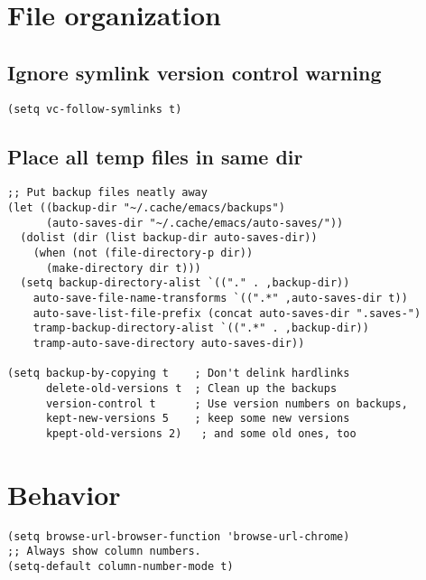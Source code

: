 \documentclass[11pt]{article}
\begin{document}
\section{File organization}
\label{sec:org862c5fd}
\subsection{Ignore symlink version control warning}
\label{sec:orge6fd171}
\begin{verbatim}
(setq vc-follow-symlinks t)
\end{verbatim}
\subsection{Place all temp files in same dir}
\label{sec:orgdbb36a1}
\begin{verbatim}
;; Put backup files neatly away
(let ((backup-dir "~/.cache/emacs/backups")
      (auto-saves-dir "~/.cache/emacs/auto-saves/"))
  (dolist (dir (list backup-dir auto-saves-dir))
    (when (not (file-directory-p dir))
      (make-directory dir t)))
  (setq backup-directory-alist `(("." . ,backup-dir))
	auto-save-file-name-transforms `((".*" ,auto-saves-dir t))
	auto-save-list-file-prefix (concat auto-saves-dir ".saves-")
	tramp-backup-directory-alist `((".*" . ,backup-dir))
	tramp-auto-save-directory auto-saves-dir))

(setq backup-by-copying t    ; Don't delink hardlinks
      delete-old-versions t  ; Clean up the backups
      version-control t      ; Use version numbers on backups,
      kept-new-versions 5    ; keep some new versions
      kpept-old-versions 2)   ; and some old ones, too
\end{verbatim}
\section{Behavior}
\label{sec:orga836d56}
\begin{verbatim}
(setq browse-url-browser-function 'browse-url-chrome)
;; Always show column numbers.
(setq-default column-number-mode t)
\end{verbatim}
\end{document}
